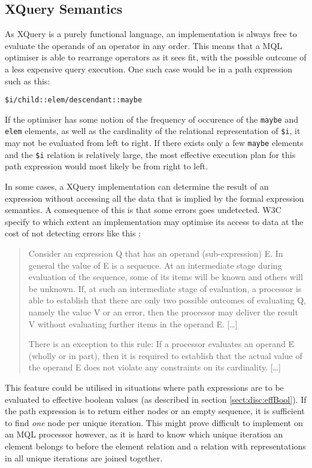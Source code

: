 \subsection{XQuery Semantics}

As XQuery is a purely functional language, an implementation is always free to
evaluate the operands of an operator in any order\cite{w3c00}. This means that a MQL optimiser is able to rearrange operators as it sees fit, with the
possible outcome of a less expensive query execution. One such case would be in a path expression such as this:
\begin{center}
\texttt{\$i/child::elem/descendant::maybe}
\end{center}
If the optimiser has some notion of the frequency of occurence of the \texttt{maybe} and \texttt{elem} elements,
as well as the cardinality of the relational representation of \texttt{\$i}, it may not be evaluated from left to
right. If there exists only a few \texttt{maybe} elements and the \texttt{\$i} relation is relatively large, the
most effective execution plan for this path expression would most likely be from right to left.

In some cases, a XQuery implementation can determine the result of an expression without accessing all the data
that is implied by the formal expression semantics. A consequence of this is that some errors goes undetected. W3C
specify to which extent an implementation may optimise its access to data at the cost of not detecting errors
like this \cite{w3c00}:

\begin{quote}
Consider an expression Q that has an operand (sub-expression) E. In general the value of E is a sequence. At an
intermediate stage during evaluation of the sequence, some of its items will be known and others will be unknown.
If, at such an intermediate stage of evaluation, a processor is able to establish that there are only two possible
outcomes of evaluating Q, namely the value V or an error, then the processor may deliver the result V without
evaluating further items in the operand E. [\ldots]

There is an exception to this rule: If a processor evaluates an operand E (wholly or in part), then it is required
to establish that the actual value of the operand E does not violate any constraints on its cardinality. [\ldots] 
\end{quote}

This feature could be utilised in situations where path expressions are to be
evaluated to effective boolean values (as described in section \ref{sect:disc:effBool}). If the path expression is to return either nodes or an empty
sequence, it is sufficient to find \emph{one} node per unique iteration. This might prove difficult to implement
on an MQL processor however, as it is hard to know which unique iteration an
element belongs to before the element relation and a relation with representations in all unique iterations are joined together.

